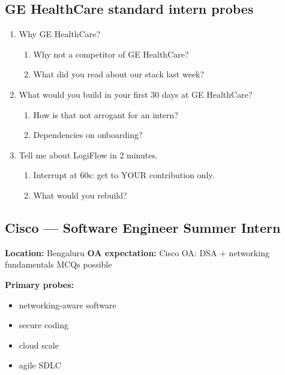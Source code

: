 \documentclass[9pt,a4paper]{article}
\begin{document}
\subsection{GE HealthCare standard intern probes}
\begin{enumerate}[label=\textbf{Q\arabic*:}, leftmargin=*]
  \item Why GE HealthCare?
  \begin{enumerate}[label=\textit{FU\arabic*:}, leftmargin=2em]
    \item Why not a competitor of GE HealthCare?
    \item What did you read about our stack last week?
  \end{enumerate}
  \item What would you build in your first 30 days at GE HealthCare?
  \begin{enumerate}[label=\textit{FU\arabic*:}, leftmargin=2em]
    \item How is that not arrogant for an intern?
    \item Dependencies on onboarding?
  \end{enumerate}
  \item Tell me about LogiFlow in 2 minutes.
  \begin{enumerate}[label=\textit{FU\arabic*:}, leftmargin=2em]
    \item Interrupt at 60s: get to YOUR contribution only.
    \item What would you rebuild?
  \end{enumerate}
\end{enumerate}
\newpage
\subsection{Cisco --- Software Engineer Summer Intern}
\textbf{Location:} Bengaluru \quad \textbf{OA expectation:} Cisco OA: DSA + networking fundamentals MCQs possible

\textbf{Primary probes:}
\begin{itemize}
  \item networking-aware software
  \item secure coding
  \item cloud scale
  \item agile SDLC
\end{itemize}
\end{document}
